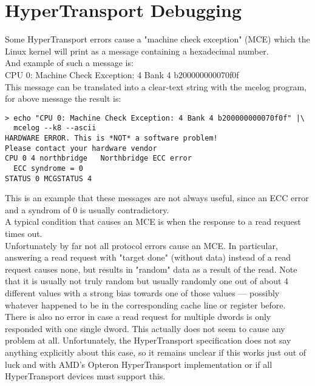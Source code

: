 \chapter{HyperTransport Debugging}
Some HyperTransport errors cause a "machine check exception" (MCE) which
the Linux kernel will print as a message containing a hexadecimal
number.\\
And example of such a message is:\\
CPU 0: Machine Check Exception: 4 Bank 4 b200000000070f0f\\
This message can be translated into a clear-text string
with the mcelog program, for above message the result is:\\
\begin{verbatim}
> echo "CPU 0: Machine Check Exception: 4 Bank 4 b200000000070f0f" |\
  mcelog --k8 --ascii
HARDWARE ERROR. This is *NOT* a software problem!
Please contact your hardware vendor
CPU 0 4 northbridge   Northbridge ECC error
  ECC syndrome = 0
STATUS 0 MCGSTATUS 4
\end{verbatim}
This is an example that these messages are not always useful, since
an ECC error and a syndrom of 0 is usually contradictory.\\
A typical condition that causes an MCE is when the response
to a read request times out.\\
Unfortunately by far not all protocol errors cause an MCE. In particular,
answering a read request with "target done" (without data) instead of
a read request causes none, but results in "random" data as a result
of the read.
Note that it is usually not truly random but usually randomly one out of
about 4 different values with a strong bias towards one of those values
--- possibly whatever happened to be in the corresponding cache line or
register before.\\
There is also no error in case a read request for multiple dwords is only
responded with one single dword. This actually does not seem to cause
any problem at all. Unfortunately, the HyperTransport specification does
not say anything explicitly about this case, so it remains unclear if
this works just out of luck and with AMD's Opteron HyperTransport
implementation or if all HyperTransport devices must support this.\\

